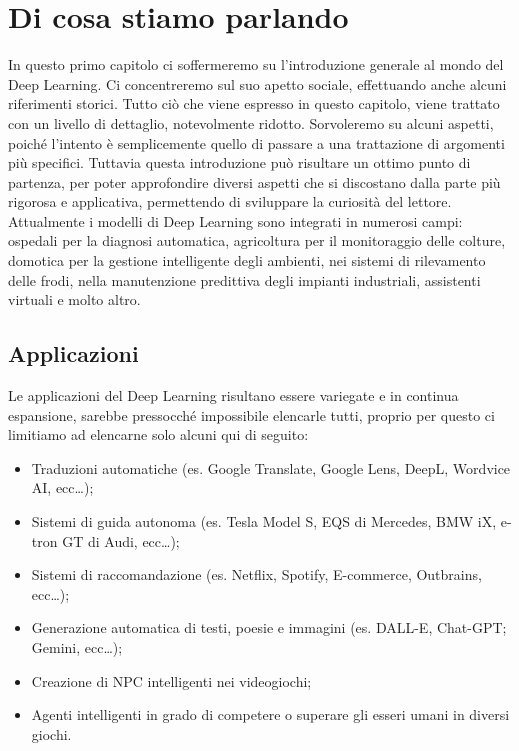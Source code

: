 \chapter{Di cosa stiamo parlando}
In questo primo capitolo ci soffermeremo su l'introduzione generale al mondo del Deep Learning. Ci concentreremo sul suo apetto sociale, effettuando anche alcuni riferimenti storici. Tutto ciò che viene espresso in questo capitolo, viene trattato con un livello di dettaglio, notevolmente ridotto. Sorvoleremo su alcuni aspetti, poiché l'intento è semplicemente quello di passare a una trattazione di argomenti più specifici. Tuttavia questa introduzione può risultare un ottimo punto di partenza, per poter approfondire diversi aspetti che si discostano dalla parte più rigorosa e applicativa, permettendo di sviluppare la curiosità del lettore. Attualmente i modelli di Deep Learning sono integrati in numerosi campi: ospedali per la diagnosi automatica, agricoltura per il monitoraggio delle colture, domotica per la gestione intelligente degli ambienti, nei sistemi di rilevamento delle frodi, nella manutenzione predittiva degli impianti industriali, assistenti virtuali e molto altro.

\section{Applicazioni}

Le applicazioni del Deep Learning risultano essere variegate e in continua espansione, sarebbe pressocché impossibile elencarle tutti, proprio per questo ci limitiamo ad elencarne solo alcuni qui di seguito:

\begin{itemize}
    \item Traduzioni automatiche (es. Google Translate, Google Lens, DeepL, Wordvice AI, ecc\dots);
    \item Sistemi di guida autonoma (es. Tesla Model S, EQS di Mercedes, BMW iX, e-tron GT di Audi, ecc\dots);
    \item Sistemi di raccomandazione (es. Netflix, Spotify, E-commerce, Outbrains, ecc\dots);
    \item Generazione automatica di testi, poesie e immagini (es. DALL-E, Chat-GPT; Gemini, ecc\dots);
    \item Creazione di NPC intelligenti nei videogiochi;
    \item Agenti intelligenti in grado di competere o superare gli esseri umani in diversi giochi.
\end{itemize}

